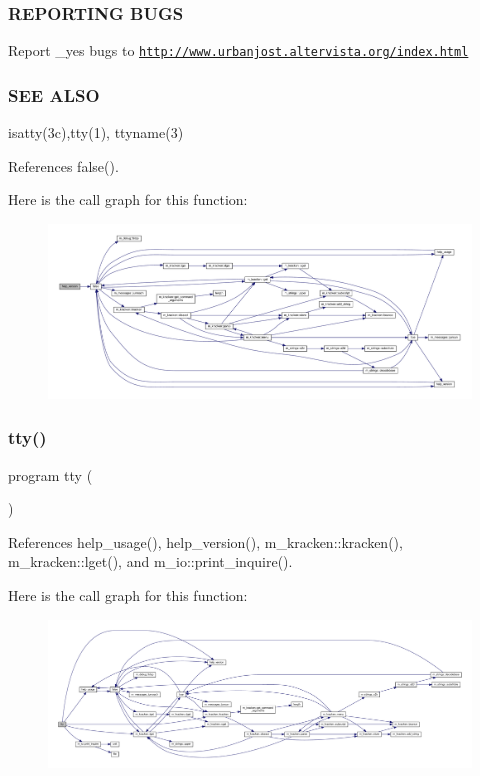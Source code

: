 \subsubsection*{R\+E\+P\+O\+R\+T\+I\+NG B\+U\+GS}

Report \+\_\+yes bugs to \href{http://www.urbanjost.altervista.org/index.html}{\tt http\+://www.\+urbanjost.\+altervista.\+org/index.\+html}

\subsubsection*{S\+EE A\+L\+SO}

isatty(3c),tty(1), ttyname(3) 

References false().

Here is the call graph for this function\+:
\nopagebreak
\begin{figure}[H]
\begin{center}
\leavevmode
\includegraphics[width=350pt]{__tty_8f90_a39c21619b08a3c22f19e2306efd7f766_cgraph}
\end{center}
\end{figure}
\mbox{\label{__tty_8f90_a860b0e8d8a94aa5cc835f634fdff3bd8}} 
\subsubsection{\texorpdfstring{tty()}{tty()}}
{\footnotesize\ttfamily program tty (\begin{DoxyParamCaption}{ }\end{DoxyParamCaption})}



References help\+\_\+usage(), help\+\_\+version(), m\+\_\+kracken\+::kracken(), m\+\_\+kracken\+::lget(), and m\+\_\+io\+::print\+\_\+inquire().

Here is the call graph for this function\+:
\nopagebreak
\begin{figure}[H]
\begin{center}
\leavevmode
\includegraphics[width=350pt]{__tty_8f90_a860b0e8d8a94aa5cc835f634fdff3bd8_cgraph}
\end{center}
\end{figure}
